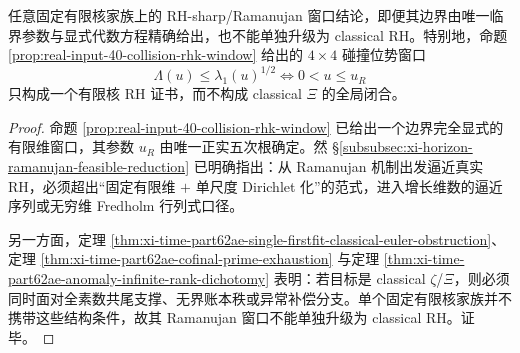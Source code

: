 \begin{corollary}\label{cor:xi-time-part62ae-ramanujan-window-no-classical-upgrade}
任意固定有限核家族上的 RH-sharp/Ramanujan 窗口结论，即便其边界由唯一临界参数与显式代数方程精确给出，也不能单独升级为 classical RH。特别地，命题 \ref{prop:real-input-40-collision-rhk-window} 给出的 \(4\times 4\) 碰撞位势窗口
\[
\Lambda(u)\le \lambda_1(u)^{1/2}
\iff
0<u\le u_R
\]
只构成一个有限核 RH 证书，而不构成 classical \(\Xi\) 的全局闭合。
\end{corollary}
\begin{proof}
命题 \ref{prop:real-input-40-collision-rhk-window} 已给出一个边界完全显式的有限维窗口，其参数 \(u_R\) 由唯一正实五次根确定。然 \S\ref{subsubsec:xi-horizon-ramanujan-feasible-reduction} 已明确指出：从 Ramanujan 机制出发逼近真实 RH，必须超出“固定有限维 \(+\) 单尺度 Dirichlet 化”的范式，进入增长维数的逼近序列或无穷维 Fredholm 行列式口径。

另一方面，定理 \ref{thm:xi-time-part62ae-single-firstfit-classical-euler-obstruction}、定理 \ref{thm:xi-time-part62ae-cofinal-prime-exhaustion} 与定理 \ref{thm:xi-time-part62ae-anomaly-infinite-rank-dichotomy} 表明：若目标是 classical \(\zeta\)/\(\Xi\)，则必须同时面对全素数共尾支撑、无界账本秩或异常补偿分支。单个固定有限核家族并不携带这些结构条件，故其 Ramanujan 窗口不能单独升级为 classical RH。证毕。
\end{proof}

